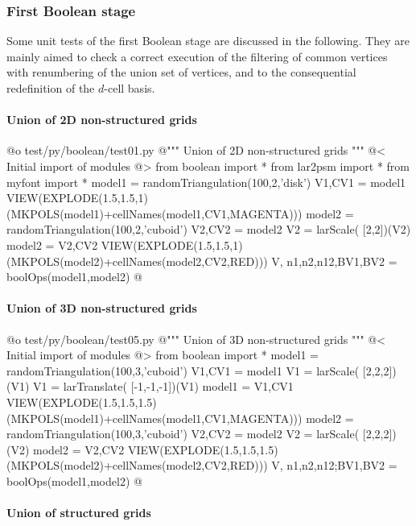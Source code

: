 \documentclass[11pt,oneside]{article}	%
\begin{document}
\subsubsection{First Boolean stage}

Some unit tests of the first Boolean stage are discussed in the following. They are mainly aimed to check a correct execution of the filtering of common vertices with renumbering of the union set of vertices, and to the consequential redefinition of the $d$-cell basis.

\paragraph{Union of 2D non-structured grids}

@o test/py/boolean/test01.py
@{""" Union of 2D non-structured grids """
@< Initial import of modules @>
from boolean import *
from lar2psm import *
from myfont import *
model1 = randomTriangulation(100,2,'disk')
V1,CV1 = model1
VIEW(EXPLODE(1.5,1.5,1)(MKPOLS(model1)+cellNames(model1,CV1,MAGENTA)))
model2 = randomTriangulation(100,2,'cuboid')
V2,CV2 = model2
V2 = larScale( [2,2])(V2)
model2 = V2,CV2 
VIEW(EXPLODE(1.5,1.5,1)(MKPOLS(model2)+cellNames(model2,CV2,RED)))
V, n1,n2,n12,BV1,BV2 = boolOps(model1,model2)
@}

\paragraph{Union of 3D non-structured grids}

@o test/py/boolean/test05.py
@{""" Union of 3D non-structured grids """
@< Initial import of modules @>
from boolean import *
model1 = randomTriangulation(100,3,'cuboid')
V1,CV1 = model1
V1 = larScale( [2,2,2])(V1)
V1 = larTranslate( [-1,-1,-1])(V1)
model1 = V1,CV1 
VIEW(EXPLODE(1.5,1.5,1.5)(MKPOLS(model1)+cellNames(model1,CV1,MAGENTA)))
model2 = randomTriangulation(100,3,'cuboid')
V2,CV2 = model2
V2 = larScale( [2,2,2])(V2)
model2 = V2,CV2 
VIEW(EXPLODE(1.5,1.5,1.5)(MKPOLS(model2)+cellNames(model2,CV2,RED)))
V, n1,n2,n12;BV1,BV2 = boolOps(model1,model2)
@}


\paragraph{Union of structured grids}
\end{document}
